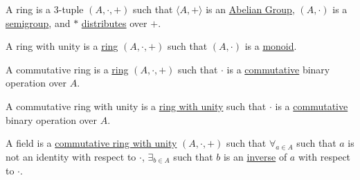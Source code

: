 \documentclass[crop=false,class=book,oneside]{standalone}
\begin{document}
            \begin{definition}
                \label{Definition:MathEnc:Analysis:Sum:Ring}
                A ring is a 3-tuple $(A,\cdot,+)$ such that
                $\langle A,+\rangle$ is an
                \hyperref[%
                    Definition:MathEnc:Analysis:%
                    Sum:AbelianGroup%
                ]{Abelian Group},
                $(A,\cdot)$ is a
                \hyperref[%
                    Definition:MathEnc:Analysis:%
                    Sum:Semigroup%
                ]{semigroup},
                and $*$
                \hyperref[%
                    Definition:MathEnc:Analysis:%
                    Sum:Distribute%
                ]{distributes}
                over $+$.
            \end{definition}
            \begin{definition}
                \label{Definition:MathEnc:Analysis:Sum:RingUnit}
                A ring with unity is a
                \hyperref[Definition:MathEnc:Analysis:Sum:Ring]{ring}
                $(A,\cdot,+)$ such that $(A,\cdot)$ is a
                \hyperref[%
                    Definition:MathEnc:%
                    Analysis:Sum:Monoid%
                ]{monoid}.
            \end{definition}
            \begin{definition}
                \label{Definition:MathEnc:Analysis:Sum:ComRing}
                A commutative ring is a
                \hyperref[Definition:MathEnc:Analysis:Sum:Ring]{ring}
                $(A,\cdot,+)$ such that $\cdot$ is a
                \hyperref[%
                    Definition:MathEnc:%
                    Analysis:Sum:CommunativeOperation%
                ]{commutative}
                binary operation over $A$.
            \end{definition}
            \begin{definition}
                \label{Definition:MathEnc:Analysis:Sum:ComRingUnit}
                A commutative ring with unity is a 
                \hyperref[%
                    Definition:MathEnc:%
                    Analysis:Sum:RingUnit%
                ]{ring with unity}
                such that $\cdot$ is a
                \hyperref[%
                    Definition:MathEnc:%
                    Analysis:Sum:CommunativeOperation%
                ]{commutative}
                binary operation over $A$.
            \end{definition}
            \begin{definition}
                \label{Definition:MathEnc:Analysis:Sum:Field}
                A field is a 
                \hyperref[%
                    Definition:MathEnc:%
                    Analysis:Sum:ComRingUnit%
                ]{commutative ring with unity}
                $(A,\cdot,+)$ such that $\forall_{a\in A}$
                such that $a$ is not an identity with respect
                to $\cdot$, $\exists_{b\in A}$ such that $b$ is an
                \hyperref[%
                    Definition:MathEnc:Analysis:%
                    Sum:Inverse%
                ]{inverse} of $a$ with respect to $\cdot$.
            \end{definition}
\end{document}
